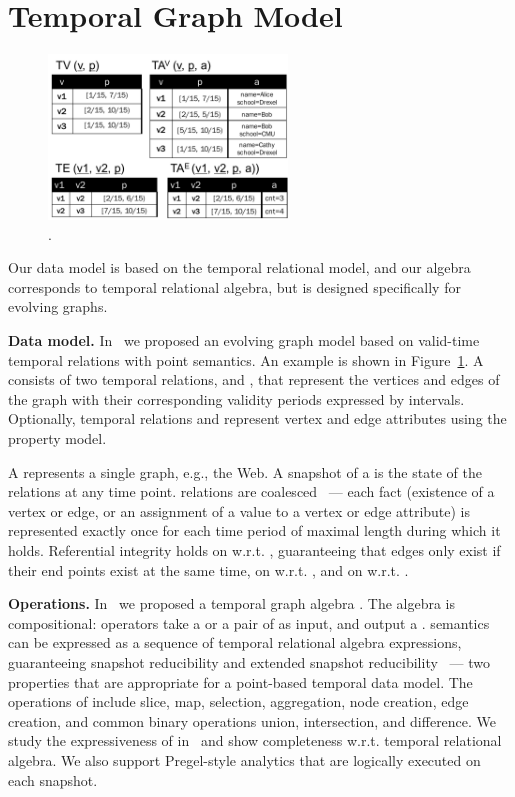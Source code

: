 \section{Temporal Graph Model}
\label{sec:tga}

\begin{figure}[t]
\centering
\includegraphics[width=2.5in]{figs/T1_rel.pdf}
\vspace{-0.2cm}
\caption{\tg {}.}
\vspace{-0.5cm}
\label{fig:tg_rel}
\end{figure}

Our data model is based on the temporal relational model, and our
algebra corresponds to temporal relational algebra, but is designed
specifically for evolving graphs.  

{\bf Data model.}  In~\cite{PortalarXiv2016} we proposed an evolving
graph model \tg based on valid-time temporal relations with point
semantics. An example is shown in Figure~\ref{fig:tg_rel}.  A \tg
consists of two temporal relations,  and , that
represent the vertices and edges of the graph with their corresponding
validity periods expressed by intervals.  Optionally, temporal
relations  and  represent vertex and edge
attributes using the property model.

A \tg represents a single graph, e.g., the Web.  A
snapshot of a \tg is the state of the relations at any time point.
\tg relations are coalesced~\cite{DBLP:conf/vldb/BohlenSS96} --- each
fact (existence of a vertex or edge, or an assignment of a value to a
vertex or edge attribute) is represented exactly once for each time
period of maximal length during which it holds.  Referential integrity
holds on  w.r.t. , guaranteeing that edges only
exist if their end points exist at the same time, on 
w.r.t. , and on  w.r.t. .

{\bf Operations.} In~\cite{PortalarXiv2016} we proposed a temporal
graph algebra \tga.  The algebra is compositional: operators take a
\tg or a pair of \tgs as input, and output a \tg.  \tga semantics can
be expressed as a sequence of temporal relational algebra expressions,
guaranteeing snapshot reducibility and extended snapshot
reducibility~\cite{DBLP:reference/db/Bohlen092} --- two properties
that are appropriate for a point-based temporal data model.  The
operations of \tga include slice, map, selection, aggregation, node
creation, edge creation, and common binary operations union,
intersection, and difference.  We study the expressiveness of \tga
in~\cite{PortalarXiv2016} and show completeness w.r.t. temporal
relational algebra.  We also support Pregel-style analytics that are
logically executed on each snapshot.


